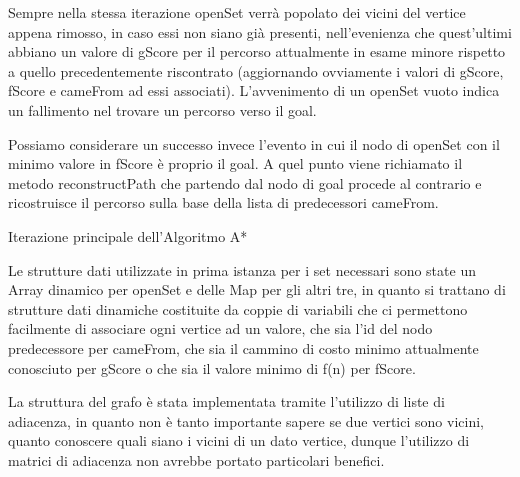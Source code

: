 \documentclass[12pt,a4paper]{report}
\begin{document}
Sempre nella stessa iterazione openSet verrà popolato dei vicini del vertice appena rimosso, in caso essi non siano già presenti, nell'evenienza che quest'ultimi abbiano un valore di gScore per il percorso attualmente in esame minore rispetto a quello precedentemente riscontrato (aggiornando ovviamente i valori di gScore, fScore e cameFrom ad essi associati).
L'avvenimento di un openSet vuoto indica un fallimento nel trovare un percorso verso il goal.

Possiamo considerare un successo invece l'evento in cui il nodo di openSet con il minimo valore in fScore è proprio il goal. A quel punto viene richiamato il metodo reconstructPath che partendo dal nodo di goal procede al contrario e ricostruisce il percorso sulla base della lista di predecessori cameFrom. 

\begin{algorithm}[H]
	\SetAlgoLined
	\caption{Iterazione principale dell'Algoritmo A*}
\end{algorithm}
\bigskip
Le strutture dati utilizzate in prima istanza per i set necessari sono state un Array dinamico per openSet e delle Map per gli altri tre, in quanto si trattano di strutture dati dinamiche costituite da coppie di variabili che ci permettono facilmente di associare ogni vertice ad un valore, che sia l'id del nodo predecessore per cameFrom, che sia il cammino di costo minimo attualmente conosciuto per gScore o che sia il valore minimo di f(n) per fScore.


La struttura del grafo è stata implementata tramite l'utilizzo di liste di adiacenza, in quanto non è tanto importante sapere se due vertici sono vicini, quanto conoscere quali siano i vicini di un dato vertice, dunque l'utilizzo di matrici di adiacenza non avrebbe portato particolari  benefici.
\end{document}
